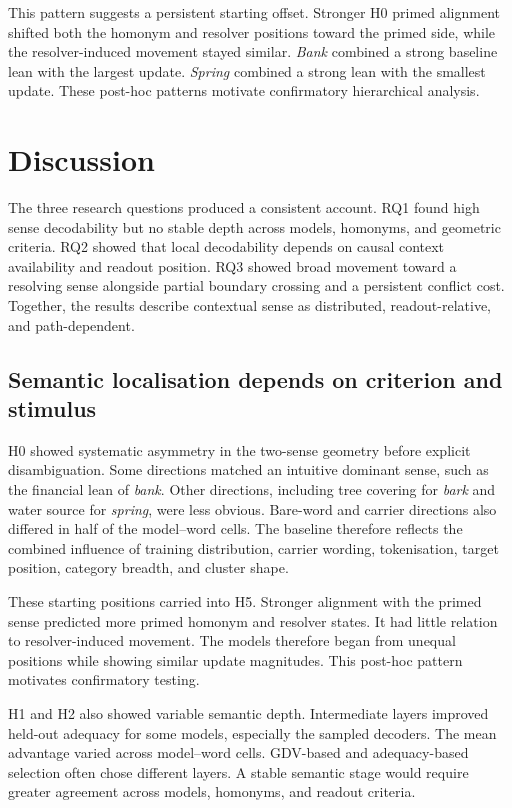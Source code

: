 \documentclass[conference]{IEEEtran}
\begin{document}
This pattern suggests a persistent starting offset. Stronger H0 primed
alignment shifted both the homonym and resolver positions toward the primed
side, while the resolver-induced movement stayed similar. \emph{Bank} combined
a strong baseline lean with the largest update. \emph{Spring} combined a strong
lean with the smallest update. These post-hoc patterns motivate confirmatory
hierarchical analysis.

\FloatBarrier

\section{Discussion}
\label{ch:discussion}

The three research questions produced a consistent account. RQ1 found high
sense decodability but no stable depth across models, homonyms, and geometric
criteria. RQ2 showed that local decodability depends on causal context
availability and readout position. RQ3 showed broad movement toward a resolving
sense alongside partial boundary crossing and a persistent conflict cost.
Together, the results describe contextual sense as distributed,
readout-relative, and path-dependent.

\subsection{Semantic localisation depends on criterion and stimulus}
\label{sec:discussion-localisation}

H0 showed systematic asymmetry in the two-sense geometry before explicit
disambiguation. Some directions matched an intuitive dominant sense, such as
the financial lean of \emph{bank}. Other directions, including tree covering
for \emph{bark} and water source for \emph{spring}, were less obvious.
Bare-word and carrier directions also differed in half of the model--word
cells. The baseline therefore reflects the combined influence of training
distribution, carrier wording, tokenisation, target position, category breadth,
and cluster shape.

These starting positions carried into H5. Stronger alignment with the primed
sense predicted more primed homonym and resolver states. It had little relation
to resolver-induced movement. The models therefore began from unequal
positions while showing similar update magnitudes. This post-hoc pattern
motivates confirmatory testing.

H1 and H2 also showed variable semantic depth. Intermediate layers improved
held-out adequacy for some models, especially the sampled decoders. The mean
advantage varied across model--word cells. GDV-based and adequacy-based
selection often chose different layers. A stable semantic stage would require
greater agreement across models, homonyms, and readout criteria.
\end{document}
